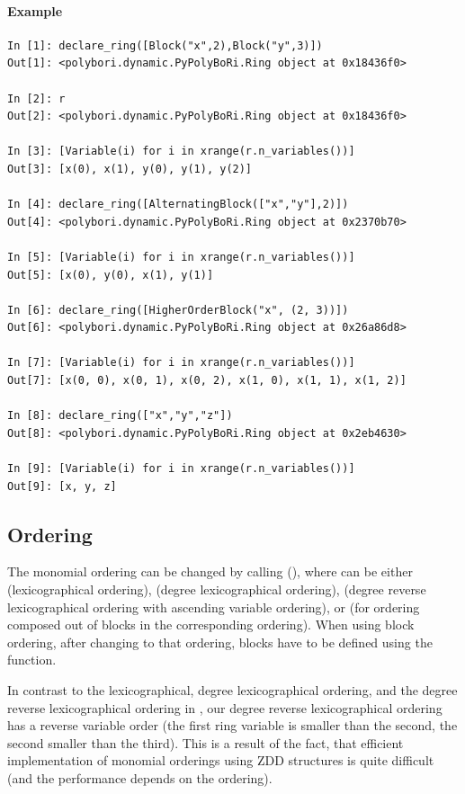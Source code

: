 \paragraph{Example}
\begin{lstlisting}
In [1]: declare_ring([Block("x",2),Block("y",3)])
Out[1]: <polybori.dynamic.PyPolyBoRi.Ring object at 0x18436f0>

In [2]: r
Out[2]: <polybori.dynamic.PyPolyBoRi.Ring object at 0x18436f0>

In [3]: [Variable(i) for i in xrange(r.n_variables())]
Out[3]: [x(0), x(1), y(0), y(1), y(2)]

In [4]: declare_ring([AlternatingBlock(["x","y"],2)])
Out[4]: <polybori.dynamic.PyPolyBoRi.Ring object at 0x2370b70>

In [5]: [Variable(i) for i in xrange(r.n_variables())]
Out[5]: [x(0), y(0), x(1), y(1)]

In [6]: declare_ring([HigherOrderBlock("x", (2, 3))])
Out[6]: <polybori.dynamic.PyPolyBoRi.Ring object at 0x26a86d8>

In [7]: [Variable(i) for i in xrange(r.n_variables())]
Out[7]: [x(0, 0), x(0, 1), x(0, 2), x(1, 0), x(1, 1), x(1, 2)]

In [8]: declare_ring(["x","y","z"])
Out[8]: <polybori.dynamic.PyPolyBoRi.Ring object at 0x2eb4630>

In [9]: [Variable(i) for i in xrange(r.n_variables())]
Out[9]: [x, y, z]  
\end{lstlisting}



\subsection{Ordering}
The monomial ordering can be changed by calling
(), where  can be either  (lexicographical ordering),  (degree lexicographical ordering),  (degree reverse lexicographical ordering with ascending variable ordering),  or  (for ordering composed out of blocks in the corresponding ordering). When using block ordering, after changing to that ordering, blocks have to be defined using the  function.

In contrast to the lexicographical, degree lexicographical ordering, and the degree reverse lexicographical ordering in \Singular, our degree reverse lexicographical ordering has a reverse variable order (the first ring variable is smaller than the second, the second smaller than the third). This is a result of the fact, that efficient implementation of monomial orderings using ZDD structures is quite difficult (and the performance depends on the ordering).
